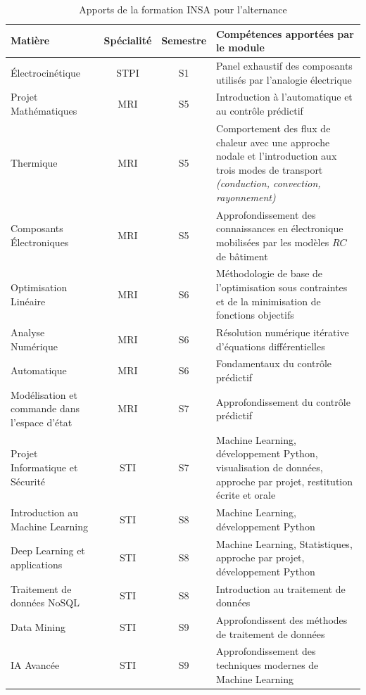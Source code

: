 \begin{table}[H]
    \centering \renewcommand{\arraystretch}{1.3}
    \begin{tabularx}{\textwidth}{lccX}
             \toprule \textbf{Matière} & \textbf{Spécialité} & \textbf{Semestre} & \textbf{Compétences apportées par le module}\\
             \midrule
             Électrocinétique & STPI & S1 & Panel exhaustif des composants utilisés par l'analogie électrique\\
             Projet Mathématiques & \gls{MRI} & S5 & Introduction à l'automatique et au contrôle prédictif \\
             Thermique & \gls{MRI} & S5 & Comportement des flux de chaleur avec une approche nodale et l'introduction aux trois modes de transport \textit{(conduction, convection, rayonnement)}\\
             Composants Électroniques & \gls{MRI} & S5 & Approfondissement des connaissances en électronique mobilisées par les modèles $RC$ de bâtiment\\
             Optimisation Linéaire & \gls{MRI} & S6 & Méthodologie de base de l'optimisation sous contraintes et de la minimisation de fonctions objectifs \\
             Analyse Numérique & \gls{MRI} & S6 & Résolution numérique itérative d'équations différentielles \\
             Automatique & \gls{MRI} & S6 & Fondamentaux du contrôle prédictif \\
             Modélisation et commande dans l'espace d'état & \gls{MRI} & S7 & Approfondissement du contrôle prédictif \\
             Projet Informatique et Sécurité & \gls{STI} & S7 & Machine Learning, développement Python, visualisation de données, approche par projet, restitution écrite et orale \\
             Introduction au Machine Learning & \gls{STI} & S8 & Machine Learning, développement Python \\
             Deep Learning et applications & \gls{STI} & S8 & Machine Learning, Statistiques, approche par projet, développement Python \\
             Traitement de données NoSQL & \gls{STI} & S8 & Introduction au traitement de données \\
             Data Mining & \gls{STI} & S9 & Approfondissent des méthodes de traitement de données \\
             IA Avancée & \gls{STI} & S9 & Approfondissement des techniques modernes de Machine Learning \\
             \bottomrule
    \end{tabularx}
    \caption{Apports de la formation INSA pour l'alternance}
    \label{tab:modules}
\end{table}


